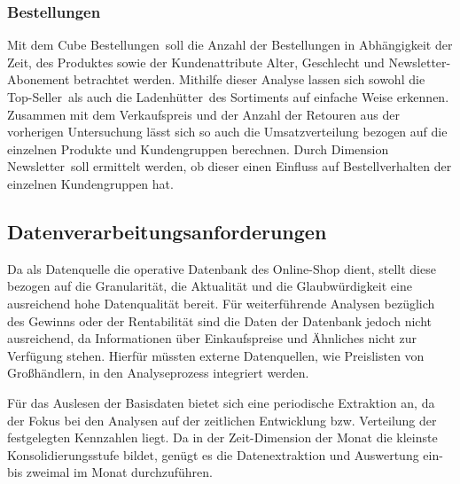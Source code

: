 \subsubsection*{Bestellungen}
\begin{figure}[htbp] 
  \centering
     
\end{figure}
\vspace{10cm}
Mit dem Cube \glqq Bestellungen\grqq ~soll die Anzahl der Bestellungen in Abhängigkeit der Zeit, des Produktes sowie der Kundenattribute Alter, Geschlecht und Newsletter-Abonement betrachtet werden. Mithilfe dieser Analyse lassen sich sowohl die \glqq Top-Seller\grqq ~als auch die \glqq Ladenhütter\grqq ~des Sortiments auf einfache Weise erkennen. Zusammen mit dem Verkaufspreis und der Anzahl der Retouren aus der vorherigen Untersuchung lässt sich so auch die Umsatzverteilung bezogen auf die einzelnen Produkte und Kundengruppen berechnen. Durch Dimension \glqq Newsletter\grqq ~soll ermittelt werden, ob dieser einen Einfluss auf Bestellverhalten der einzelnen Kundengruppen hat.


\pagebreak

\subsection{Datenverarbeitungsanforderungen}

Da als Datenquelle die operative Datenbank des Online-Shop dient, stellt diese bezogen auf die Granularität, die Aktualität und die Glaubwürdigkeit eine ausreichend hohe Datenqualität bereit.
Für weiterführende Analysen bezüglich des Gewinns oder der Rentabilität sind die Daten der Datenbank jedoch nicht ausreichend, da Informationen über Einkaufspreise und Ähnliches nicht zur Verfügung stehen. Hierfür müssten externe Datenquellen, wie Preislisten von Großhändlern, in den Analyseprozess integriert werden.

Für das Auslesen der Basisdaten bietet sich eine periodische Extraktion an, da der Fokus bei den Analysen auf der zeitlichen Entwicklung bzw. Verteilung der festgelegten Kennzahlen liegt.
Da in der Zeit-Dimension der Monat die kleinste Konsolidierungsstufe bildet, genügt es die Datenextraktion und Auswertung ein- bis zweimal im Monat durchzuführen.
